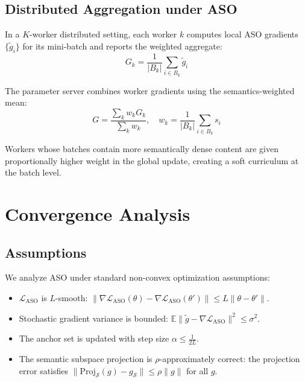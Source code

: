 \documentclass[11pt,a4paper]{article}
\begin{document}
\subsection{Distributed Aggregation under ASO}

In a $K$-worker distributed setting, each worker $k$ computes local ASO gradients
$\{\tilde{g}_i\}$ for its mini-batch and reports the weighted aggregate:
\begin{equation}
    G_k = \frac{1}{|B_k|} \sum_{i \in B_k} \tilde{g}_i
    \label{eq:local_aggregate}
\end{equation}

The parameter server combines worker gradients using the semantics-weighted mean:
\begin{equation}
    G = \frac{\sum_k w_k G_k}{\sum_k w_k}, \quad
    w_k = \frac{1}{|B_k|} \sum_{i \in B_k} s_i
    \label{eq:global_aggregate}
\end{equation}

Workers whose batches contain more semantically dense content are given proportionally
higher weight in the global update, creating a soft curriculum at the batch level.

\section{Convergence Analysis}
\label{sec:theory}

\subsection{Assumptions}

We analyze ASO under standard non-convex optimization assumptions:

\begin{itemize}
    \item[\textbf{A1.}] $\mathcal{L}_{\text{ASO}}$ is $L$-smooth: $\|\nabla \mathcal{L}_{\text{ASO}}(\theta) - \nabla \mathcal{L}_{\text{ASO}}(\theta')\| \leq L\|\theta - \theta'\|$.
    \item[\textbf{A2.}] Stochastic gradient variance is bounded: $\mathbb{E}\|\tilde{g} - \nabla \mathcal{L}_{\text{ASO}}\|^2 \leq \sigma^2$.
    \item[\textbf{A3.}] The anchor set is updated with step size $\alpha \leq \frac{1}{2L}$.
    \item[\textbf{A4.}] The semantic subspace projection is $\rho$-approximately correct: the projection error satisfies $\|\text{Proj}_{\mathcal{S}}(g) - g_{\mathcal{S}}\| \leq \rho \|g\|$ for all $g$.
\end{itemize}
\end{document}
